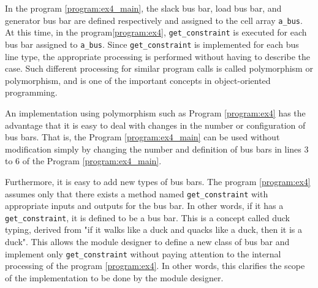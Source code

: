 \documentclass[graybox, envcountchap]{svmult}
\begin{document}
\begin{example}
In the program \nobreak\ref{program:ex4_main}, the slack bus bar, load bus bar, and generator bus bar are defined respectively and assigned to the cell array \verb|a_bus|.
At this time, in the program\nobreak\ref{program:ex4}, \verb|get_constraint| is executed for each bus bar assigned to \verb|a_bus|.
Since \verb|get_constraint| is implemented for each bus line type, the appropriate processing is performed without having to describe the case.
Such different processing for similar program calls is called {polymorphism} or {polymorphism}, and is one of the important concepts in object-oriented programming.

An implementation using polymorphism such as Program \nobreak\ref{program:ex4} has the advantage that it is easy to deal with changes in the number or configuration of bus bars.
That is, the Program \nobreak\ref{program:ex4_main} can be used without modification simply by changing the number and definition of bus bars in lines 3 to 6 of the Program \nobreak\ref{program:ex4_main}.

Furthermore, it is easy to add new types of bus bars.
The program \nobreak\ref{program:ex4} assumes only that there exists a method named \verb|get_constraint| with appropriate inputs and outputs for the bus bar.
In other words, if it has a \verb|get_constraint|, it is defined to be a bus bar.
This is a concept called duck typing, derived from "if it walks like a duck and quacks like a duck, then it is a duck".
This allows the module designer to define a new class of bus bar and implement only \verb|get_constraint| without paying attention to the internal processing of the program \nobreak\ref{program:ex4}.
In other words, this clarifies the scope of the implementation to be done by the module designer.
\end{example}
\end{document}
